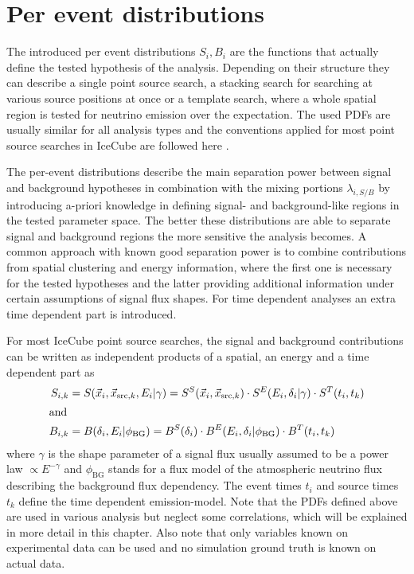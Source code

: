 \section{Per event distributions}
The introduced per event distributions $S_i, B_i$ are the functions that actually define the tested hypothesis of the analysis.
Depending on their structure they can describe a single point source search, a stacking search for searching at various source positions at once or a template search, where a whole spatial region is tested for neutrino emission over the expectation.
The used PDFs are usually similar for all analysis types and the conventions applied for most point source searches in IceCube are followed here .

The per-event distributions describe the main separation power between signal and background hypotheses in combination with the mixing portions $\lambda_{i,S/B}$ by introducing a-priori knowledge in defining signal- and background-like regions in the tested parameter space.
The better these distributions are able to separate signal and background regions the more sensitive the analysis becomes.
A common approach with known good separation power is to combine contributions from spatial clustering and energy information, where the first one is necessary for the tested hypotheses and the latter providing additional information under certain assumptions of signal flux shapes.
For time dependent analyses an extra time dependent part is introduced.

For most IceCube point source searches, the signal and background contributions can be written as independent products of a spatial, an energy and a time dependent part as
\begin{align}
  S_{i,k}
    &= S(\vec{x}_i, \vec{x}_{\mathrm{src},k}, E_i | \gamma)
     = S^S(\vec{x}_i, \vec{x}_{\mathrm{src},k}) \cdot
       S^E(E_i, \delta_i | \gamma) \cdot
       S^T(t_i, t_k) \\
  \intertext{and}
  B_{i,k}
    &= B(\delta_i, E_i | \phi_\mathrm{BG})
     = B^S(\delta_i) \cdot
       B^E(E_i, \delta_i | \phi_\mathrm{BG}) \cdot
       B^T(t_i, t_k)
\end{align}
where $\gamma$ is the shape parameter of a signal flux usually assumed to be a power law $\propto E^{-\gamma}$ and $\phi_\mathrm{BG}$ stands for a flux model of the atmospheric neutrino flux describing the background flux dependency.
The event times $t_i$ and source times $t_k$ define the time dependent emission-model.
Note that the PDFs defined above are used in various analysis but neglect some correlations, which will be explained in more detail in this chapter.
Also note that only variables known on experimental data can be used and no simulation ground truth is known on actual data.

